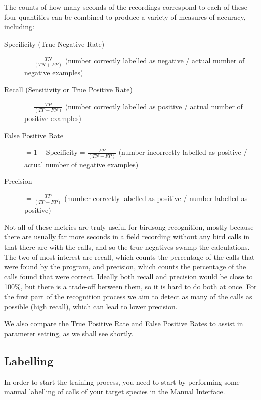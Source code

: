 \documentclass{article}
\begin{document}
The counts of how many seconds of the recordings correspond to each of these four quantities can be combined to produce a variety of measures of accuracy, including:

\begin{description}
\item[Specificity (True Negative Rate)] $= \frac{TN}{(TN + FP)}$ (number correctly labelled as negative / actual number of negative examples)
\item[Recall (Sensitivity or True Positive Rate)] $= \frac{TP}{(TP + FN)}$ (number correctly labelled as positive / actual number of positive examples) 
\item[False Positive Rate] $= 1 - \mathrm{Specificity} = \frac{FP}{(TN + FP)}$ (number incorrectly labelled as positive / actual number of negative examples)
\item[Precision] $= \frac{TP}{(TP + FP)}$ (number correctly labelled as positive / number labelled as positive)
\end{description}

Not all of these metrics are truly useful for birdsong recognition, mostly because there are usually far more seconds in a field recording without any bird calls in that there are with the calls, and so the true negatives swamp the calculations. The two of most interest are recall, which counts the percentage of the calls that were found by the program, and precision, which counts the percentage of the calls found that were correct. Ideally both recall and precision would be close to 100\%, but there is a trade-off between them, so it is hard to do both at once. For the first part of the recognition process we aim to detect as many of the calls as possible (high recall), which can lead to lower precision. 

We also compare the True Positive Rate and False Positive Rates to assist in parameter setting, as we shall see shortly.

\subsection{Labelling}

In order to start the training process, you need to start by performing some manual labelling of calls of your target species in the Manual Interface.
\end{document}

